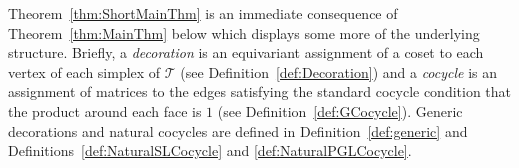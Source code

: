 \documentclass[12pt]{amsart}
\newtheorem{theorem}{Theorem}[section]
\theoremstyle{definition}
\numberwithin{equation}{section}
\def\rk{\mathrm{rk}}
\def\longto{\longrightarrow}
\def\be{  \begin{equation} }
\def\ee{  \end{equation} }
\def\CT{\mathcal T}
\def\T{\mathcal{T}}
\begin{document}


Theorem~\ref{thm:ShortMainThm} is an immediate consequence of Theorem~\ref{thm:MainThm} below which displays some more of the underlying structure. Briefly, a \emph{decoration} is an equivariant assignment of a coset to each vertex of each simplex of $\T$ (see Definition~\ref{def:Decoration}) and a \emph{cocycle} is an assignment of matrices to the edges satisfying the standard cocycle condition that the product around each face is $1$ (see Definition~\ref{def:GCocycle}). Generic decorations and natural cocycles are defined in Definition~\ref{def:generic} and Definitions~\ref{def:NaturalSLCocycle} and \ref{def:NaturalPGLCocycle}. %
\end{document}
